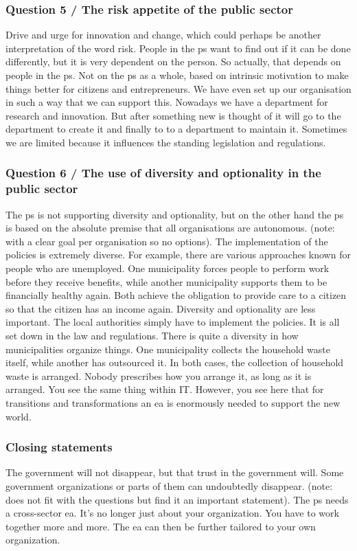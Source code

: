 \subsubsection{Question 5 / The risk appetite of the public sector}
Drive and urge for innovation and change, which could perhaps be another interpretation of the word risk. People in the \gls{ps} want to find out if it can be done differently, but it is very dependent on the person. So actually, that depends on people in the \gls{ps}. Not on the \gls{ps} as a whole, based on intrinsic motivation to make things better for citizens and entrepreneurs. We have even set up our organisation in such a way that we can support this. Nowadays we have a department for research and innovation. But after something new is thought of it will go to the department to create it and finally to to a department to maintain it. Sometimes we are limited because it influences the standing legislation and regulations.
\subsubsection{Question 6 / The use of diversity and optionality in the public sector}
The \gls{ps} is not supporting diversity and optionality, but on the other hand the \gls{ps} is based on the absolute premise that all organisations are autonomous. (note: with a clear goal per organisation so no options). The implementation of the policies is extremely diverse. For example, there are various approaches known for people who are unemployed. One municipality forces people to perform work before they receive benefits, while another municipality supports them to be financially healthy again. Both achieve the obligation to provide care to a citizen so that the citizen has an income again. Diversity and optionality are less important. The local authorities simply have to implement the policies. It is all set down in the law and regulations. There is quite a diversity in how municipalities organize things. One municipality collects the household waste itself, while another has outsourced it. In both cases, the collection of household waste is arranged. Nobody prescribes how you arrange it, as long as it is arranged. You see the same thing within IT. However, you see here that for transitions and transformations an \gls{ea} is enormously needed to support the new world.
\subsubsection{Closing statements}
The government will not disappear, but that trust in the government will. Some government organizations or parts of them can undoubtedly disappear. (note: does not fit with the questions but find it an important statement).
The \gls{ps} needs a cross-sector \gls{ea}. It's no longer just about your organization. You have to work together more and more. The \gls{ea} can then be further tailored to your own organization.
